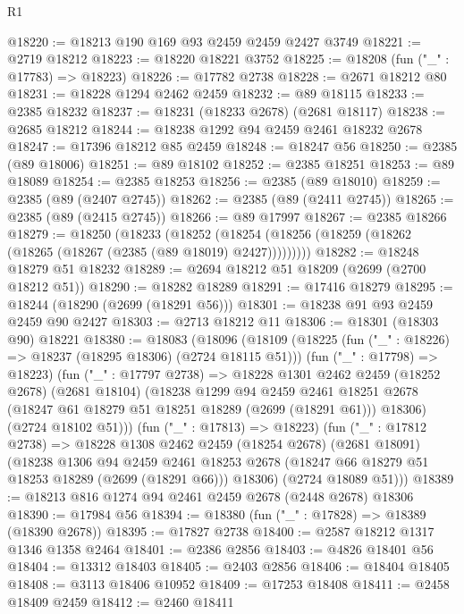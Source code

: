 \begin{lexlean}{R1}
\begin{coremodule}
@18220 := @18213 @190 @169 @93 @2459 @2459 @2427 @3749
@18221 := @2719 @18212
@18223 := @18220 @18221 @3752
@18225 := @18208 (fun ("_" : @17783) => @18223)
@18226 := @17782 @2738
@18228 := @2671 @18212 @80
@18231 := @18228 @1294 @2462 @2459
@18232 := @89 @18115
@18233 := @2385 @18232
@18237 := @18231 (@18233 @2678) (@2681 @18117)
@18238 := @2685 @18212
@18244 := @18238 @1292 @94 @2459 @2461 @18232 @2678
@18247 := @17396 @18212 @85 @2459
@18248 := @18247 @56
@18250 := @2385 (@89 @18006)
@18251 := @89 @18102
@18252 := @2385 @18251
@18253 := @89 @18089
@18254 := @2385 @18253
@18256 := @2385 (@89 @18010)
@18259 := @2385 (@89 (@2407 @2745))
@18262 := @2385 (@89 (@2411 @2745))
@18265 := @2385 (@89 (@2415 @2745))
@18266 := @89 @17997
@18267 := @2385 @18266
@18279 := @18250
    (@18233
      (@18252 (@18254 (@18256 (@18259 (@18262 (@18265 (@18267 (@2385 (@89 @18019) @2427)))))))))
@18282 := @18248 @18279 @51 @18232
@18289 := @2694 @18212 @51 @18209 (@2699 (@2700 @18212 @51))
@18290 := @18282 @18289
@18291 := @17416 @18279
@18295 := @18244 (@18290 (@2699 (@18291 @56)))
@18301 := @18238 @91 @93 @2459 @2459 @90 @2427
@18303 := @2713 @18212 @11
@18306 := @18301 (@18303 @90) @18221
@18380 := @18083
    (@18096
      (@18109
        (@18225 (fun ("_" : @18226) => @18237 (@18295 @18306) (@2724 @18115 @51)))
        (fun ("_" : @17798) => @18223)
        (fun ("_" : @17797 @2738) =>
        @18228
          @1301
          @2462
          @2459
          (@18252 @2678)
          (@2681 @18104)
          (@18238
            @1299
            @94
            @2459
            @2461
            @18251
            @2678
            (@18247 @61 @18279 @51 @18251 @18289 (@2699 (@18291 @61)))
            @18306)
          (@2724 @18102 @51)))
      (fun ("_" : @17813) => @18223)
      (fun ("_" : @17812 @2738) =>
      @18228
        @1308
        @2462
        @2459
        (@18254 @2678)
        (@2681 @18091)
        (@18238
          @1306
          @94
          @2459
          @2461
          @18253
          @2678
          (@18247 @66 @18279 @51 @18253 @18289 (@2699 (@18291 @66)))
          @18306)
        (@2724 @18089 @51)))
@18389 := @18213 @816 @1274 @94 @2461 @2459 @2678 (@2448 @2678) @18306
@18390 := @17984 @56
@18394 := @18380 (fun ("_" : @17828) => @18389 (@18390 @2678))
@18395 := @17827 @2738
@18400 := @2587 @18212 @1317 @1346 @1358 @2464
@18401 := @2386 @2856
@18403 := @4826 @18401 @56
@18404 := @13312 @18403
@18405 := @2403 @2856
@18406 := @18404 @18405
@18408 := @3113 @18406 @10952
@18409 := @17253 @18408
@18411 := @2458 @18409 @2459
@18412 := @2460 @18411

\end{coremodule}
\end{lexlean}
